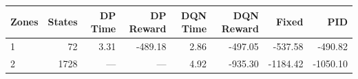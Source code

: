 \begin{tabular}{lrrrrrrr}
\hline
Zones & States & DP Time & DP Reward & DQN Time & DQN Reward & Fixed & PID \\
\hline
1 & 72 & 3.31 & -489.18 & 2.86 & -497.05 & -537.58 & -490.82 \\
2 & 1728 & --- & --- & 4.92 & -935.30 & -1184.42 & -1050.10 \\
\hline
\end{tabular}